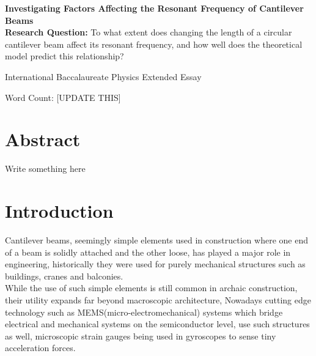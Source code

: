 \documentclass[a4paper,12pt]{article}
\begin{document}
\begin{titlepage}
    \begin{center}
        \vspace*{1cm}

        \textbf{Investigating Factors Affecting the Resonant Frequency of Cantilever Beams}\\

        \vspace{.5cm}
        \textbf{Research Question:}
        To what extent does changing the length of a circular cantilever beam affect its resonant frequency, and how well does the theoretical model predict this relationship?

        \vspace{0.5cm}
        International Baccalaureate Physics Extended Essay

        \vfill

        \vspace{0.8cm}

        Word Count: [UPDATE THIS]\\


    \end{center}
\end{titlepage}

\tableofcontents
\pagebreak

\section{Abstract}%
Write something here

\section{Introduction}%

    Cantilever beams, seemingly simple elements used in construction where one end of a beam is solidly attached and the other loose, has played a major role in engineering, historically they were used for purely mechanical structures such as buildings, cranes and balconies.
    \autocite{BuildingConstructionBook}\\
    While the use of such simple elements is still common in archaic construction, their utility expands far beyond macroscopic architecture, Nowadays cutting edge technology such as MEMS(micro-electromechanical) systems which bridge electrical and mechanical systems on the semiconductor level, use such structures as well, microscopic strain gauges being used in gyroscopes to sense tiny acceleration forces.
    \autocite{MemsBook}%
\end{document}
